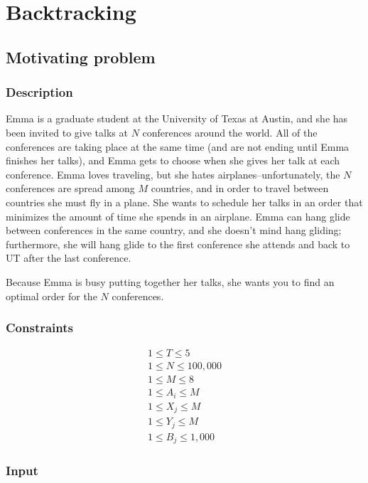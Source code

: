 \section{Backtracking}

\subsection*{Motivating problem}

\subsubsection*{Description}

Emma is a graduate student at the University of Texas at Austin, and she has been invited to give talks at $N$ conferences around the world. All of the conferences are taking place at the same time (and are not ending until Emma finishes her talks), and Emma gets to choose when she gives her talk at each conference. Emma loves traveling, but she hates airplanes--unfortunately, the $N$ conferences are spread among $M$ countries, and in order to travel between countries she must fly in a plane. She wants to schedule her talks in an order that minimizes the amount of time she spends in an airplane. Emma can hang glide between conferences in the same country, and she doesn't mind hang gliding; furthermore, she will hang glide to the first conference she attends and back to UT after the last conference.

Because Emma is busy putting together her talks, she wants you to find an optimal order for the $N$ conferences.

\subsubsection*{Constraints}

\begin{gather*}
1 \leq T \leq 5 \\
1 \leq N \leq 100,000 \\
1 \leq M \leq 8 \\
1 \leq A_i \leq M \\
1 \leq X_j \leq M \\
1 \leq Y_j \leq M \\
1 \leq B_j \leq 1,000
\end{gather*}

\subsubsection*{Input}

